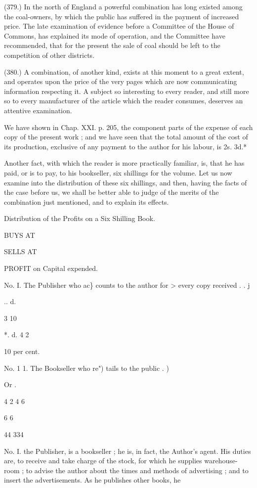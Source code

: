 \documentclass{article}
\begin{document}
(379.) In the north of England a powerful combination has long existed among the coal-owners, by which the public has suffered in the payment of increased price. The late examination of evidence before a Committee of the House of Commons, has explained its mode of operation, and the Committee have recommended, that for the present the sale of coal should be left to the competition of other districts.


(380.) A combination, of another kind, exists at this moment to a great extent, and operates upon the price of the very pages which are now communicating information respecting it. A subject so interesting to every reader, and still more so to every manufacturer of the article which the reader consumes, deserves an attentive examination.


We have shown in Chap. XXI. p. 205, the component parts of the expense of each copy of the present work ; and we have seen that the total amount of the cost of its production, exclusive of any payment to the author for his labour, is 2s. 3d.*


Another fact, with which the reader is more practically familiar, is, that he has paid, or is to pay, to his bookseller, six shillings for the volume. Let us now examine into the distribution of these six shillings, and then, having the facts of the case before us, we shall be better able to judge of the merits of the combination just mentioned, and to explain its effects.


Distribution of the Profits on a Six Shilling Book.




BUYS AT


SELLS AT


PROFIT on Capital expended.


No. I. The Publisher who ac\} counts to the author for > every copy received . . j


.. d.


3 10


*. d. 4 2


10 per cent.


No. 1 1. The Bookseller who re") tails to the public . )


Or .


4 2 4 6


6 6


44 334


No. I. the Publisher, is a bookseller ; he is, in fact, the Author's agent. His duties are, to receive and take charge of the stock, for which he supplies warehouse-room ; to advise the author about the times and methods of advertising ; and to insert the advertisements. As he publishes other books, he
\end{document}
